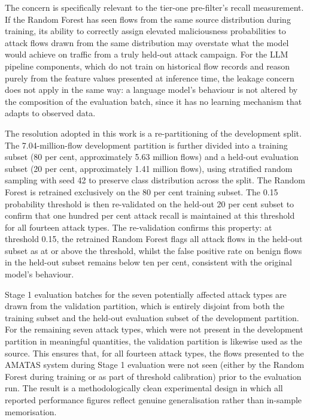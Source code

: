 The concern is specifically relevant to the tier-one pre-filter's recall measurement. If the Random Forest has seen flows from the same source distribution during training, its ability to correctly assign elevated maliciousness probabilities to attack flows drawn from the same distribution may overstate what the model would achieve on traffic from a truly held-out attack campaign. For the LLM pipeline components, which do not train on historical flow records and reason purely from the feature values presented at inference time, the leakage concern does not apply in the same way: a language model's behaviour is not altered by the composition of the evaluation batch, since it has no learning mechanism that adapts to observed data.

The resolution adopted in this work is a re-partitioning of the development split. The 7.04-million-flow development partition is further divided into a training subset (80 per cent, approximately 5.63 million flows) and a held-out evaluation subset (20 per cent, approximately 1.41 million flows), using stratified random sampling with seed 42 to preserve class distribution across the split. The Random Forest is retrained exclusively on the 80 per cent training subset. The 0.15 probability threshold is then re-validated on the held-out 20 per cent subset to confirm that one hundred per cent attack recall is maintained at this threshold for all fourteen attack types. The re-validation confirms this property: at threshold 0.15, the retrained Random Forest flags all attack flows in the held-out subset as at or above the threshold, whilst the false positive rate on benign flows in the held-out subset remains below ten per cent, consistent with the original model's behaviour.

Stage 1 evaluation batches for the seven potentially affected attack types are drawn from the validation partition, which is entirely disjoint from both the training subset and the held-out evaluation subset of the development partition. For the remaining seven attack types, which were not present in the development partition in meaningful quantities, the validation partition is likewise used as the source. This ensures that, for all fourteen attack types, the flows presented to the AMATAS system during Stage 1 evaluation were not seen (either by the Random Forest during training or as part of threshold calibration) prior to the evaluation run. The result is a methodologically clean experimental design in which all reported performance figures reflect genuine generalisation rather than in-sample memorisation.

